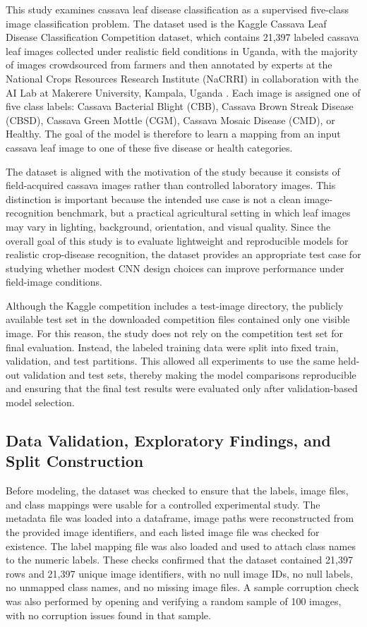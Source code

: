 \documentclass[11pt]{article}
\begin{document}
This study examines cassava leaf disease classification as a supervised five-class image classification problem. The dataset used is the Kaggle Cassava Leaf Disease Classification Competition dataset, which contains 21,397 labeled cassava leaf images collected under realistic field conditions in Uganda, with the majority of images crowdsourced from farmers and then annotated by experts at the National Crops Resources Research Institute (NaCRRI) in collaboration with the AI Lab at Makerere University, Kampala, Uganda \cite{mwebaze2019,kaggleCassava}. Each image is assigned one of five class labels: Cassava Bacterial Blight (CBB), Cassava Brown Streak Disease (CBSD), Cassava Green Mottle (CGM), Cassava Mosaic Disease (CMD), or Healthy. The goal of the model is therefore to learn a mapping from an input cassava leaf image to one of these five disease or health categories.

The dataset is aligned with the motivation of the study because it consists of field-acquired cassava images rather than controlled laboratory images. This distinction is important because the intended use case is not a clean image-recognition benchmark, but a practical agricultural setting in which leaf images may vary in lighting, background, orientation, and visual quality. Since the overall goal of this study is to evaluate lightweight and reproducible models for realistic crop-disease recognition, the dataset provides an appropriate test case for studying whether modest CNN design choices can improve performance under field-image conditions.

Although the Kaggle competition includes a test-image directory, the publicly available test set in the downloaded competition files contained only one visible image. For this reason, the study does not rely on the competition test set for final evaluation. Instead, the labeled training data were split into fixed train, validation, and test partitions. This allowed all experiments to use the same held-out validation and test sets, thereby making the model comparisons reproducible and ensuring that the final test results were evaluated only after validation-based model selection.

\subsection{Data Validation, Exploratory Findings, and Split Construction}

Before modeling, the dataset was checked to ensure that the labels, image files, and class mappings were usable for a controlled experimental study. The metadata file was loaded into a dataframe, image paths were reconstructed from the provided image identifiers, and each listed image file was checked for existence. The label mapping file was also loaded and used to attach class names to the numeric labels. These checks confirmed that the dataset contained 21,397 rows and 21,397 unique image identifiers, with no null image IDs, no null labels, no unmapped class names, and no missing image files. A sample corruption check was also performed by opening and verifying a random sample of 100 images, with no corruption issues found in that sample.
\end{document}
